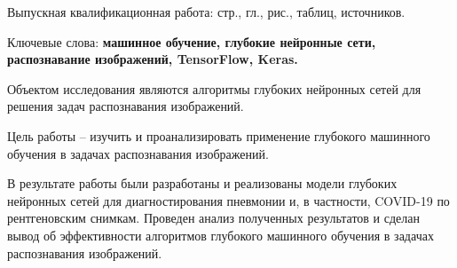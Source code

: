 
Выпускная квалификационная работа: \pageref{LastPage} стр., 
 гл., 
\totalfigures{} рис.,
\totaltables{} таблиц,
 источников.

Ключевые слова: \textbf{машинное обучение, глубокие нейронные сети, распознавание изображений, TensorFlow, Keras.}

Объектом исследования являются алгоритмы глубоких нейронных сетей для решения задач распознавания изображений. 

Цель работы – изучить и проанализировать применение глубокого машинного обучения в задачах распознавания изображений.

В результате работы были разработаны и реализованы модели глубоких нейронных сетей для диагностирования пневмонии и, в частности, COVID-19 по рентгеновским снимкам. Проведен анализ полученных результатов и сделан вывод об эффективности алгоритмов глубокого машинного обучения в задачах распознавания изображений.

\clearpage